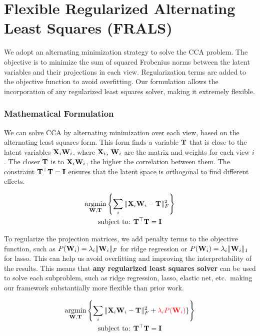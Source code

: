 \section{Flexible Regularized Alternating Least Squares (FRALS)}\label{subsec:flexible-regularized-alternating-least-squares-(frals)}
We adopt an alternating minimization strategy to solve the CCA problem.
The objective is to minimize the sum of squared Frobenius norms between the latent variables and their projections in each view.
Regularization terms are added to the objective function to avoid overfitting.
Our formulation allows the incorporation of any regularized least squares solver, making it extremely flexible.

\subsubsection{Mathematical Formulation}
We can solve CCA by alternating minimization over each view, based on the alternating least squares form.
This form finds a variable $\bold{T}$ that is close to the latent variables $\bold{X}_i\bold{W}_i$, where $\bold{X}_i$, $\bold{W}_i$ are the matrix and weights for each view $i$.
The closer $\bold{T}$ is to $\bold{X}_i\bold{W}_i$, the higher the correlation between them.
The constraint  $\bold{T^{\top}T}=\bold{I}$ ensures that the latent space is orthogonal to find different effects.

\begin{gather*}
    \underset{\bold{W},\bold{T}}{\mathrm{argmin}}\left\{\sum_i \|\bold{X}_i\bold{W}_i-\bold{T}\|_{F}^2 \right\}\\
    \text{subject to: } \bold{T^{\top}T}=\bold{I}\\
\end{gather*}

To regularize the projection matrices, we add penalty terms to the objective function, such as $P(\bold{W}_i)=\lambda_i\|\bold{W}_i\|_F$ for ridge regression or $P(\bold{W}_i)=\lambda_i\|\bold{W}_i\|_1$ for lasso.
This can help us avoid overfitting and improving the interpretability of the results.
This means that \textbf{any regularized least squares solver} can be used to solve each subproblem, such as ridge regression, lasso, elastic net, etc.\ making our framework substantially more flexible than prior work.

\begin{gather*}
    \underset{\bold{W},\bold{T}}{\mathrm{argmin}}\left\{\sum_i \|\bold{X}_i\bold{W}_i-\bold{T}\|_{F}^2 + \textcolor{red}{\lambda_i P(\bold{W}_i)}\}\right\}\\
    \text{subject to: } \bold{T^{\top}T}=\bold{I}\\
\end{gather*}

